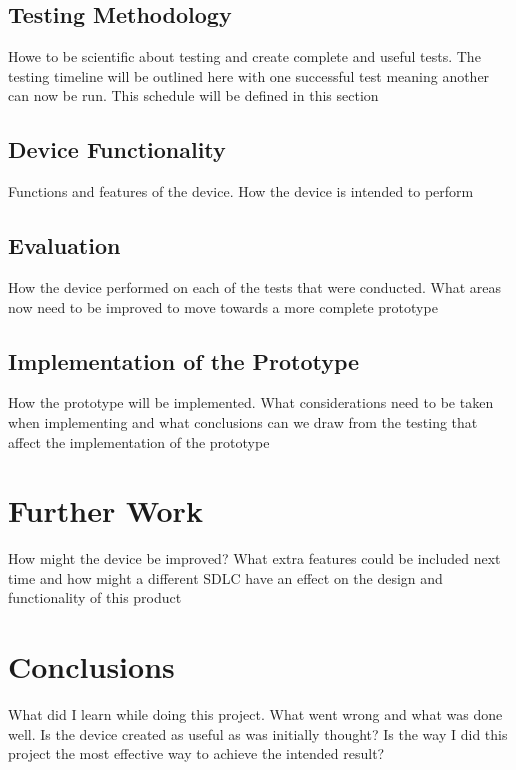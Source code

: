 \documentclass[10pt,a4paper]{article}
\begin{document}
\subsection{Testing Methodology}
Howe to be scientific about testing and create complete and useful tests. The testing timeline will be outlined here with one successful test meaning another can now be run. This schedule will be defined in this section
\subsection{Device Functionality}
Functions and features of the device. How the device is intended to perform
\subsection{Evaluation}
How the device performed on each of the tests that were conducted. What areas now need to be improved to move towards a more complete prototype
\subsection{Implementation of the Prototype}
How the prototype will be implemented. What considerations need to be taken when implementing and what conclusions can we draw from the testing that affect the implementation of the prototype

\section{Further Work}
How might the device be improved? What extra features could be included next time and how might a different SDLC have an effect on the design and functionality of this product

\section{Conclusions}
What did I learn while doing this project. What went wrong and what was done well. Is the device created as useful as was initially thought? Is the way I did this project the most effective way to achieve the intended result? 

\pagebreak


\end{document}
